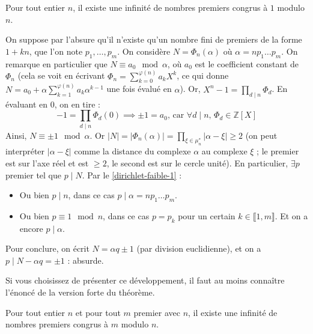 	\begin{theorem}
		Pour tout entier $n$, il existe une infinité de nombres premiers congrus à $1$ modulo $n$.
	\end{theorem}
	
	\begin{demonstration}
		On suppose par l'absure qu'il n'existe qu'un nombre fini de premiers de la forme $1+kn$, que l'on note $p_1, \dots, p_m$. On considère $N = \Phi_n(\alpha)$ où $\alpha = n p_1 \dots p_m$. On remarque en particulier que $N \equiv a_0 \mod \alpha$, où $a_0$ est le coefficient constant de $\Phi_n$ (cela se voit en écrivant $\Phi_n = \sum_{k=0}^{\varphi(n)} a_k X^k$, ce qui donne $N = a_0 + \alpha \sum_{k=1}^{\varphi(n)} a_k \alpha^{k-1}$ une fois évalué en $\alpha$).
		\newpar
		Or, $X^n - 1 = \prod_{d \mid n} \Phi_d$. En évaluant en $0$, on en tire :
		\[ -1 = \prod_{d \mid n} \Phi_d(0) \implies \pm 1 = a_0 \text{, car } \forall d \mid n, \, \Phi_d \in \mathbb{Z}[X] \]
		Ainsi, $N \equiv \pm 1 \mod \alpha$. Or $|N| = |\Phi_n(\alpha)| = \prod_{\xi \in \mu_n^*} |\alpha - \xi| \geq 2$ (on peut interpréter $|\alpha - \xi|$ comme la distance du complexe $\alpha$ au complexe $\xi$ ; le premier est sur l'axe réel et est $\geq 2$, le second est sur le cercle unité).
		\newpar
		En particulier, $\exists p$ premier tel que $p \mid N$. Par le \cref{dirichlet-faible-1} :
		\begin{itemize}
			\item Ou bien $p \mid n$, dans ce cas $p \mid \alpha = n p_1 \dots p_m$.
			\item Ou bien $p \equiv 1 \mod n$, dans ce cas $p = p_k$ pour un certain $k \in \llbracket 1, m \rrbracket$. Et on a encore $p \mid \alpha$.
		\end{itemize}
		Pour conclure, on écrit $N = \alpha q \pm 1$ (par division euclidienne), et on a $p \mid N - \alpha q = \pm 1$ : absurde.
	\end{demonstration}
	
	\begin{remark}
		Si vous choisissez de présenter ce développement, il faut au moins connaître l'énoncé de la version forte du théorème.
	\end{remark}
	
	\begin{theorem}
		Pour tout entier $n$ et pour tout $m$ premier avec $n$, il existe une infinité de nombres premiers congrus à $m$ modulo $n$.
	\end{theorem}
